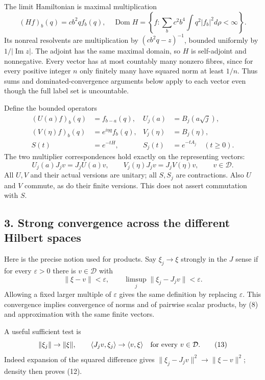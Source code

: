 \documentclass[
  11pt,
]{article}
\begin{document}
The limit Hamiltonian is maximal multiplication \[
 (Hf)_b(q)=cb^2qf_b(q),\quad
 \operatorname{Dom}H=
 \left\{f:\sum_b c^2b^4\int q^2|f_b|^2d\rho<\infty\right\}.
 \tag{9}
\] Its nonreal resolvents are multiplication by \((cb^2q-z)^{-1}\),
bounded uniformly by \(1/|\operatorname{Im}z|\). The adjoint has the
same maximal domain, so \(H\) is self-adjoint and nonnegative. Every
vector has at most countably many nonzero fibres, since for every
positive integer \(n\) only finitely many have squared norm at least
\(1/n\). Thus sums and dominated-convergence arguments below apply to
each vector even though the full label set is uncountable.

Define the bounded operators \[
 \begin{split}
 (U(a)f)_b(q)&=f_{b-a}(q),&
 U_j(a)&=B_j(a\sqrt j),\\
 (V(\eta)f)_b(q)&=e^{i\eta q}f_b(q),&
 V_j(\eta)&=B_j(\eta),\\
 S(t)&=e^{-tH},&
 S_j(t)&=e^{-tA_j}\quad(t\ge0).
 \end{split}
 \tag{10}
\] The two multiplier correspondences hold exactly on the representing
vectors: \[
 U_j(a)J_jv=J_jU(a)v,\qquad
 V_j(\eta)J_jv=J_jV(\eta)v,\qquad v\in\mathcal D.
 \tag{11}
\] All \(U,V\) and their actual versions are unitary; all \(S,S_j\) are
contractions. Also \(U\) and \(V\) commute, as do their finite versions.
This does not assert commutation with \(S\).

\subsection{3. Strong convergence across the different Hilbert
spaces}\label{weak-coupling-part-7-strong-convergence-across-the-different-hilbert-spaces}

Here is the precise notion used for products. Say \(\xi_j\to\xi\)
strongly in the \(J\) sense if for every \(\varepsilon>0\) there is
\(v\in\mathcal D\) with \[
 \|\xi-v\|<\varepsilon,\qquad
 \limsup_j\|\xi_j-J_jv\|<\varepsilon .
 \tag{12}
\] Allowing a fixed larger multiple of \(\varepsilon\) gives the same
definition by replacing \(\varepsilon\). This convergence implies
convergence of norms and of pairwise scalar products, by (8) and
approximation with the same finite vectors.

A useful sufficient test is \[
 \|\xi_j\|\to\|\xi\|,\qquad
 \langle J_jv,\xi_j\rangle\to\langle v,\xi\rangle
 \quad\hbox{for every }v\in\mathcal D.
 \tag{13}
\] Indeed expansion of the squared difference gives
\(\|\xi_j-J_jv\|^2\to\|\xi-v\|^2\); density then proves (12).
\end{document}
